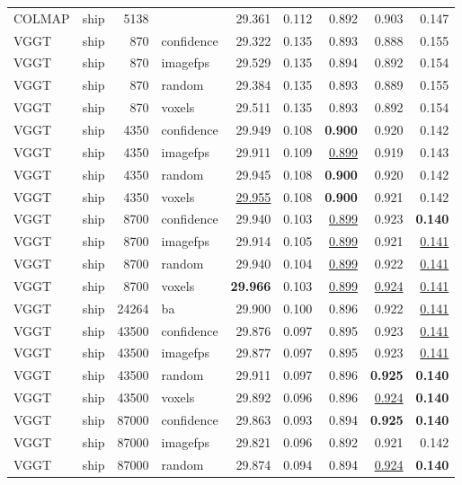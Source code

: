 \begin{table}[H]
\begin{tabular}{llrlrrrrr}
\midrule
COLMAP & ship & 5138 &  & 29.361 & 0.112 & 0.892 & 0.903 & 0.147 \\
VGGT & ship & 870 & confidence & 29.322 & 0.135 & 0.893 & 0.888 & 0.155 \\
VGGT & ship & 870 & imagefps & 29.529 & 0.135 & 0.894 & 0.892 & 0.154 \\
VGGT & ship & 870 & random & 29.384 & 0.135 & 0.893 & 0.889 & 0.155 \\
VGGT & ship & 870 & voxels & 29.511 & 0.135 & 0.893 & 0.892 & 0.154 \\
VGGT & ship & 4350 & confidence & 29.949 & 0.108 & \textbf{0.900} & 0.920 & 0.142 \\
VGGT & ship & 4350 & imagefps & 29.911 & 0.109 & \underline{0.899} & 0.919 & 0.143 \\
VGGT & ship & 4350 & random & 29.945 & 0.108 & \textbf{0.900} & 0.920 & 0.142 \\
VGGT & ship & 4350 & voxels & \underline{29.955} & 0.108 & \textbf{0.900} & 0.921 & 0.142 \\
VGGT & ship & 8700 & confidence & 29.940 & 0.103 & \underline{0.899} & 0.923 & \textbf{0.140} \\
VGGT & ship & 8700 & imagefps & 29.914 & 0.105 & \underline{0.899} & 0.921 & \underline{0.141} \\
VGGT & ship & 8700 & random & 29.940 & 0.104 & \underline{0.899} & 0.922 & \underline{0.141} \\
VGGT & ship & 8700 & voxels & \textbf{29.966} & 0.103 & \underline{0.899} & \underline{0.924} & \underline{0.141} \\
VGGT & ship & 24264 & ba & 29.900 & 0.100 & 0.896 & 0.922 & \underline{0.141} \\
VGGT & ship & 43500 & confidence & 29.876 & 0.097 & 0.895 & 0.923 & \underline{0.141} \\
VGGT & ship & 43500 & imagefps & 29.877 & 0.097 & 0.895 & 0.923 & \underline{0.141} \\
VGGT & ship & 43500 & random & 29.911 & 0.097 & 0.896 & \textbf{0.925} & \textbf{0.140} \\
VGGT & ship & 43500 & voxels & 29.892 & 0.096 & 0.896 & \underline{0.924} & \textbf{0.140} \\
VGGT & ship & 87000 & confidence & 29.863 & 0.093 & 0.894 & \textbf{0.925} & \textbf{0.140} \\
VGGT & ship & 87000 & imagefps & 29.821 & 0.096 & 0.892 & 0.921 & 0.142 \\
VGGT & ship & 87000 & random & 29.874 & 0.094 & 0.894 & \underline{0.924} & \textbf{0.140} \\

\end{tabular}
\end{table}
